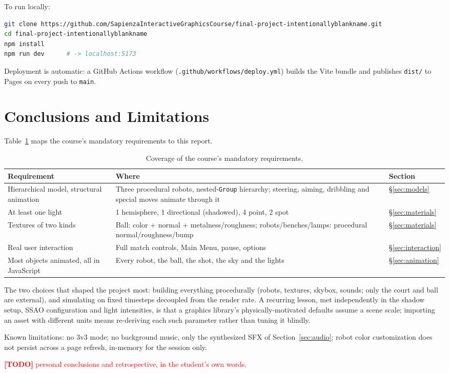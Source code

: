 \documentclass[11pt,a4paper]{article}
\newcommand{\code}[1]{\texttt{#1}}
\newcommand{\todo}[1]{\textcolor{red}{\textbf{[TODO]} #1}}
\begin{document}
To run locally:
\begin{lstlisting}[style=js, language=bash]
git clone https://github.com/SapienzaInteractiveGraphicsCourse/final-project-intentionallyblankname.git
cd final-project-intentionallyblankname
npm install
npm run dev      # -> localhost:5173
\end{lstlisting}

Deployment is automatic: a GitHub Actions workflow (\code{.github/workflows/deploy.yml}) builds the Vite bundle and publishes \code{dist/} to Pages on every push to \code{main}.

\section{Conclusions and Limitations}
\label{sec:conclusions}

Table~\ref{tab:requirements} maps the course's mandatory requirements to this report.

\begin{table}[htbp]
\centering
\small
\begin{tabularx}{\textwidth}{>{\raggedright\arraybackslash}p{4.1cm} X l}
\toprule
\textbf{Requirement} & \textbf{Where} & \textbf{Section} \\
\midrule
Hierarchical model, structural animation & Three procedural robots, nested-\code{Group} hierarchy; steering, aiming, dribbling and special moves animate through it & \S\ref{sec:models} \\
At least one light & 1 hemisphere, 1 directional (shadowed), 4 point, 2 spot & \S\ref{sec:materials} \\
Textures of two kinds & Ball: color + normal + metalness/roughness; robots/benches/lamps: procedural normal/roughness/bump & \S\ref{sec:materials} \\
Real user interaction & Full match controls, Main Menu, pause, options & \S\ref{sec:interaction} \\
Most objects animated, all in JavaScript & Every robot, the ball, the shot, the sky and the lights & \S\ref{sec:animation} \\
\bottomrule
\end{tabularx}
\caption{Coverage of the course's mandatory requirements.}
\label{tab:requirements}
\end{table}

The two choices that shaped the project most: building everything procedurally (robots, textures, skybox, sounds; only the court and ball are external), and simulating on fixed timesteps decoupled from the render rate. A recurring lesson, met independently in the shadow setup, SSAO configuration and light intensities, is that a graphics library's physically-motivated defaults assume a scene scale; importing an asset with different units means re-deriving each such parameter rather than tuning it blindly.

Known limitations: no 3v3 mode; no background music, only the synthesized SFX of Section~\ref{sec:audio}; robot color customization does not persist across a page refresh, in-memory for the session only.

\todo{personal conclusions and retrospective, in the student's own words.}
\end{document}
